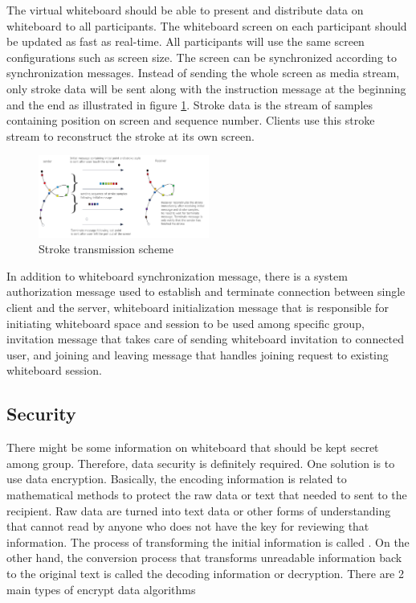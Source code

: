 \documentclass[conference]{IEEEtran}
\begin{document}
The virtual whiteboard should be able to present and distribute data on whiteboard to all participants. 
The whiteboard screen on each participant should be updated as fast as real-time. 
All participants will use the same screen configurations such as screen size. 
The screen can be synchronized according to synchronization messages. 
Instead of sending the whole screen as media stream, only stroke data will be sent along with the instruction message at the beginning and the end as illustrated in figure \ref{fig:2}. 
Stroke data is the stream of samples containing position on screen and sequence number. 
Clients use this stroke stream to reconstruct the stroke at its own screen. 

\begin{figure}[h]
\begin{center}
\includegraphics[width=0.5\textwidth]{iw_stroke_transmission.png}
\caption{Stroke transmission scheme}
\label{fig:2}
\end
{center}
\end{figure}

In addition to whiteboard synchronization message, there is a system authorization message used to establish and terminate connection between single client and the server, whiteboard initialization message that is responsible for initiating whiteboard space and session to be used among specific group, invitation message that takes care of sending whiteboard invitation to connected user, and joining and leaving message that handles joining request to existing whiteboard session.

\subsection{Security}

There might be some information on whiteboard that should be kept secret among group. 
Therefore, data security is definitely required. 
One solution is to use data encryption.
Basically, the encoding information is related to mathematical methods to protect the raw data or text that needed to sent to the recipient. 
Raw data are turned into text data or other forms of understanding that cannot read by anyone who does not have the key for reviewing that information. 
The process of transforming the initial information is called . 
On the other hand, the conversion process that transforms unreadable information back to the original text is called the decoding information or decryption. There are 2 main types of encrypt data algorithms
\end{document}
